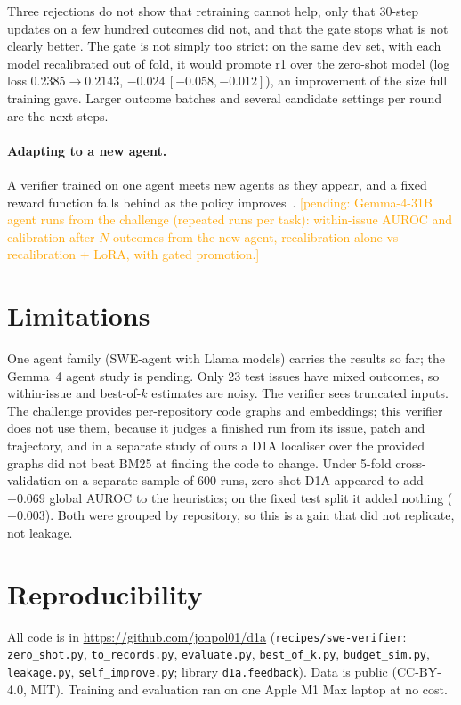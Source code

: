 \documentclass[11pt]{article}
\newcommand{\pending}[1]{\textcolor{orange}{[pending: #1]}}
\begin{document}
Three rejections do not show that retraining cannot help, only that 30-step updates on a few hundred outcomes did not, and that the gate stops what is not
clearly better. The gate is not simply too strict: on the same dev set, with each model recalibrated out of fold, it would promote r1 over the zero-shot
model (log loss $0.2385 \rightarrow 0.2143$, $-0.024\,[-0.058, -0.012]$), an improvement of the size full training gave. Larger outcome batches and several
candidate settings per round are the next steps.

\paragraph{Adapting to a new agent.} A verifier trained on one agent meets new agents as they appear, and a fixed reward function falls behind as the policy
improves~\cite{horizon}. \pending{Gemma-4-31B agent runs from the challenge (repeated runs per task): within-issue AUROC and calibration after
$N$ outcomes from the new agent, recalibration alone vs recalibration + LoRA, with gated promotion.}

\section{Limitations}
One agent family (SWE-agent with Llama models) carries the results so far; the Gemma~4 agent study is pending. Only 23 test issues have mixed outcomes, so
within-issue and best-of-$k$ estimates are noisy. The verifier sees truncated inputs. The challenge provides per-repository code graphs and embeddings; this
verifier does not use them, because it judges a finished run from its issue, patch and trajectory, and in a separate study of ours a D1A localiser over the
provided graphs did not beat BM25 at finding the code to change. Under 5-fold cross-validation on a separate sample of 600 runs, zero-shot D1A appeared to add
$+0.069$ global AUROC to the heuristics; on the fixed test split it added nothing ($-0.003$). Both were grouped by repository, so this is a gain that did not
replicate, not leakage.

\section{Reproducibility}
All code is in \url{https://github.com/jonpol01/d1a} (\texttt{recipes/swe-verifier}: \texttt{zero\_shot.py}, \texttt{to\_records.py}, \texttt{evaluate.py},
\texttt{best\_of\_k.py}, \texttt{budget\_sim.py}, \texttt{leakage.py}, \texttt{self\_improve.py}; library \texttt{d1a.feedback}). Data is public
(CC-BY-4.0, MIT). Training and evaluation ran on one Apple M1 Max laptop at no cost.
\end{document}
